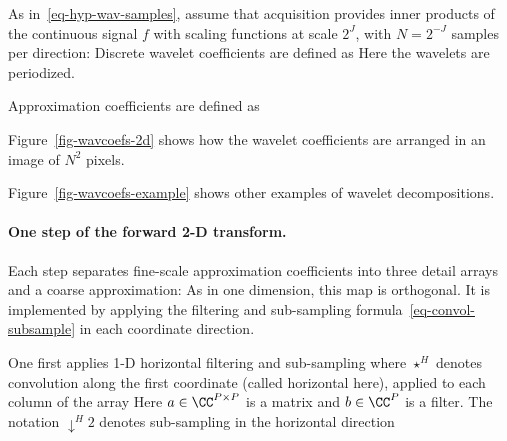 As in~\eqref{eq-hyp-wav-samples}, assume that acquisition provides inner products of the continuous signal $f$ with scaling functions at scale $2^J$, with $N=2^{-J}$ samples per direction:
Discrete wavelet coefficients are defined as
Here the wavelets are periodized.
 
Approximation coefficients are defined as


Figure~\ref{fig-wavcoefs-2d} shows how the wavelet coefficients are arranged in an image of $N^2$ pixels.
 
Figure~\ref{fig-wavcoefs-example} shows other examples of wavelet decompositions.


  
\paragraph{One step of the forward 2-D transform.}

Each step separates fine-scale approximation coefficients into three detail arrays and a coarse approximation:
As in one dimension, this map is orthogonal. It is implemented by applying the filtering and sub-sampling formula~\eqref{eq-convol-subsample} in each coordinate direction.

One first applies 1-D horizontal filtering and sub-sampling
where $\star^H$ denotes convolution along the first coordinate (called horizontal here), applied to each column of the array
Here $a\in\CC^{P\times P}$ is a matrix and $b\in\CC^P$ is a filter. The notation $\downarrow^H 2$ denotes sub-sampling in the horizontal direction

